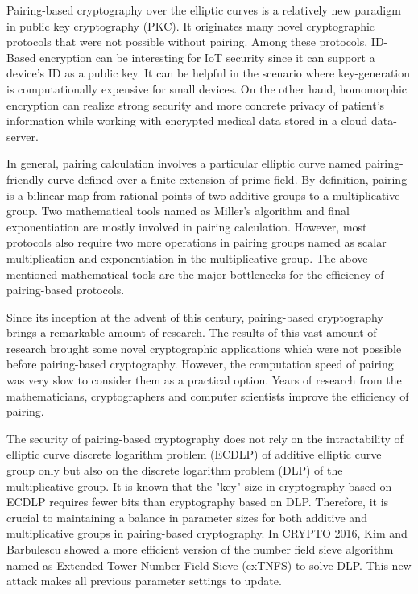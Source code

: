 Pairing-based cryptography over the elliptic curves is a relatively new paradigm in public key cryptography (PKC). 
It originates many novel cryptographic protocols that were not possible without pairing. Among these protocols, ID-Based encryption can be interesting for IoT security since it can support a device's ID as a public key. 
It can be helpful in the scenario where key-generation is computationally expensive for small devices. 
On the other hand, homomorphic encryption can realize strong security and more concrete privacy of patient’s information while working with encrypted medical data stored in a cloud data-server.


In general, pairing calculation involves a particular elliptic curve named pairing-friendly curve defined over a finite extension of prime field. 
By definition, pairing is a bilinear map from rational points of two additive groups to a multiplicative group. 
Two mathematical tools named as Miller's algorithm and final exponentiation are mostly involved in pairing calculation.
However, most protocols also require two more operations in pairing groups named as scalar multiplication and exponentiation in the multiplicative group. 
The above-mentioned mathematical tools are the major bottlenecks for the efficiency of pairing-based protocols.


Since its inception at the advent of this century, pairing-based cryptography brings a remarkable amount of research.
The results of this vast amount of research brought some novel cryptographic applications which were not possible before pairing-based cryptography. 
However, the computation speed of pairing was very slow to consider them as a practical option. 
Years of research from the mathematicians, cryptographers and computer scientists improve the efficiency of pairing.


The security of pairing-based cryptography does not rely on the intractability of elliptic curve discrete logarithm problem (ECDLP) of additive elliptic curve group only but also on the discrete logarithm problem (DLP) of the multiplicative group. 
It is known that the "key" size in cryptography based on ECDLP requires fewer bits than cryptography based on DLP. 
Therefore, it is crucial to maintaining a balance in parameter sizes for both additive and multiplicative groups in pairing-based cryptography. 
In CRYPTO 2016, Kim and Barbulescu showed a more efficient version of the number field sieve algorithm named as Extended Tower Number Field Sieve (exTNFS) to solve DLP. 
This new attack makes all previous parameter settings to update.


